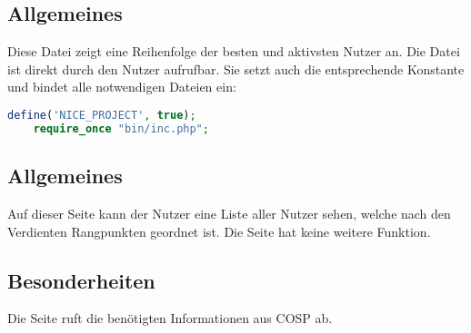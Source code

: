 \subsection{Allgemeines} Diese Datei zeigt eine Reihenfolge der besten und aktivsten Nutzer an.
Die Datei ist direkt durch den Nutzer aufrufbar. Sie setzt auch die entsprechende Konstante und bindet alle notwendigen Dateien ein:
\begin{lstlisting}[language=php]
	define('NICE_PROJECT', true);
	require_once "bin/inc.php";
\end{lstlisting}
\subsection{Allgemeines}
Auf dieser Seite kann der Nutzer eine Liste aller Nutzer sehen, welche nach den Verdienten Rangpunkten geordnet ist. Die Seite hat keine weitere Funktion.
\subsection{Besonderheiten}
Die Seite ruft die benötigten Informationen aus {\glqq COSP\grqq} ab.